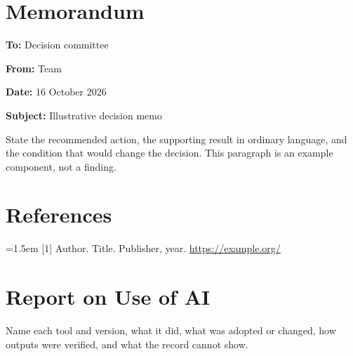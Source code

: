 \documentclass[12pt,a4paper]{article}
\newenvironment{memo}[3]{\clearpage\section*{Memorandum}%
\noindent\textbf{To:} #1\par\noindent\textbf{From:} Team \PraxisTeam\par
\noindent\textbf{Date:} #2\par\noindent\textbf{Subject:} #3\par\medskip}{\par\clearpage}
\theoremstyle{definition}\newtheorem{definition}[theorem]{Definition}
\theoremstyle{remark}\newtheorem{remark}[theorem]{Remark}
\begin{document}
\begin{memo}{Decision committee}{16 October 2026}{Illustrative decision memo}
State the recommended action, the supporting result in ordinary language, and the condition that would change the decision.
This paragraph is an example component, not a finding.
\end{memo}

\section*{References}
\begingroup\normalsize\setlength{\parindent}{0pt}\hangindent=1.5em
[1] Author. Title. Publisher, year. \url{https://example.org/}\par
\endgroup
\clearpage
\section*{Report on Use of AI}
Name each tool and version, what it did, what was adopted or changed, how outputs were verified, and what the record cannot show.
\clearpage
\end{document}
